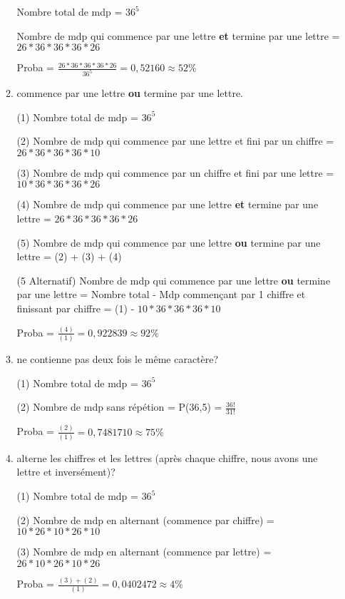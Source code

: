 \documentclass[A4paper,11pt]{article}
\begin{document}
\begin{enumerate}
\begin{enumerate}
        Nombre total de mdp = $36^5$
        
        Nombre de mdp qui commence par une lettre \textbf{et} termine par une lettre = $26*36*36*36*26$
        
        Proba = $\frac{26*36*36*36*26}{36^5} = 0,52160 \approx 52\%$
        
        
        \item  commence par une lettre \textbf{ou} termine par une lettre.
        
        (1) Nombre total de mdp = $36^5$
        
        (2) Nombre de mdp qui commence par une lettre et fini par un chiffre = $26*36*36*36*10$
        
        (3) Nombre de mdp qui commence par un chiffre et fini par une lettre = $10*36*36*36*26$
        
        (4) Nombre de mdp qui commence par une lettre \textbf{et} termine par une lettre = $26*36*36*36*26$
        
        (5) Nombre de mdp qui commence par une lettre \textbf{ou} termine par une lettre = (2) + (3) + (4)
        
        (5 Alternatif)  Nombre de mdp qui commence par une lettre \textbf{ou} termine par une lettre = Nombre total - Mdp commençant par 1 chiffre et finissant par chiffre = (1) - $10*36*36*36*10$
        
        Proba = $\frac{(4)}{(1)} = 0,922839 \approx 92\%$
        
        \item ne contienne pas deux fois le même caractère?
        
        (1) Nombre total de mdp = $36^5$
        
        (2) Nombre de mdp sans répétion = P(36,5) = $\frac{36!}{31!}$
        
        Proba = $\frac{(2)}{(1)} = 0,7481710 \approx 75\%$
        
        \item alterne les chiffres et les lettres (après chaque chiffre, nous avons une lettre et inversément)?
        
        (1) Nombre total de mdp = $36^5$
        
        (2) Nombre de mdp en alternant (commence par chiffre) = $10*26*10*26*10$
        
        (3) Nombre de mdp en alternant (commence par lettre) = $26*10*26*10*26$
        
        Proba = $\frac{(3) + (2)}{(1)} = 0,0402472 \approx 4\%$
        

\end{enumerate}
\end{enumerate}
\end{document}
